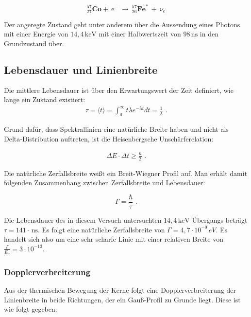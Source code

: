 \[ ^{57}_{27}\mathrm{\textbf{Co}} +\ \mathrm{e}^-\ \longrightarrow\ ^{57}_{26}\mathrm{\textbf{Fe}}^*\ +\ \nu_e\]


Der angeregte Zustand geht unter anderem über die Aussendung eines Photons mit einer Energie von $14,4\,\mathrm{keV}$ mit einer Halbwertszeit von $98\,\mathrm{ns}$ in den Grundzustand über. \cite{anleitung}

\subsection{Lebensdauer und Linienbreite}
\label{lebensdauer}
Die mittlere Lebensdauer ist über den Erwartungswert der Zeit definiert, wie lange ein Zustand existiert:
\begin{align}
\tau=\langle t\rangle=\int_{0}^{\infty}t\lambda e^{-\lambda t}dt=\frac{1}{\lambda} \text{ .}
\end{align}

Grund dafür, dass Spektrallinien eine natürliche Breite haben und nicht als Delta-Distribution auftreten, ist die Heisenbergsche Unschärferelation:

\begin{align}
\Delta E\cdot\Delta t\geq\frac{\hbar}{2}\text{ .}
\end{align}


Die natürliche Zerfallsbreite weißt ein Breit-Wiegner Profil auf. Man erhält damit folgenden Zusammenhang zwischen Zerfallsbreite und Lebensdauer:

\[\Gamma=\frac{\hbar}{\tau}\text{ .}\]


Die Lebensdauer des in diesem Versuch untersuchten $14,4\,\mathrm{keV}$-Übergangs beträgt  $\tau = 141\cdot \,\mathrm{ns}$. Es folgt eine natürliche Zerfallsbreite von $\Gamma = 4,7\cdot 10^{-9} \,\si{eV}$. Es handelt sich also um eine sehr scharfe Linie mit einer relativen Breite von $\frac{\Gamma}{E_{\gamma}}=3\cdot 10^{-13}$. \cite{jakobs}


\subsubsection{Dopplerverbreiterung}

Aus der thermischen Bewegung der Kerne folgt eine Dopplerverbreiterung der Linienbreite in beide Richtungen, der ein Gauß-Profil zu Grunde liegt. Diese ist wie folgt gegeben:

